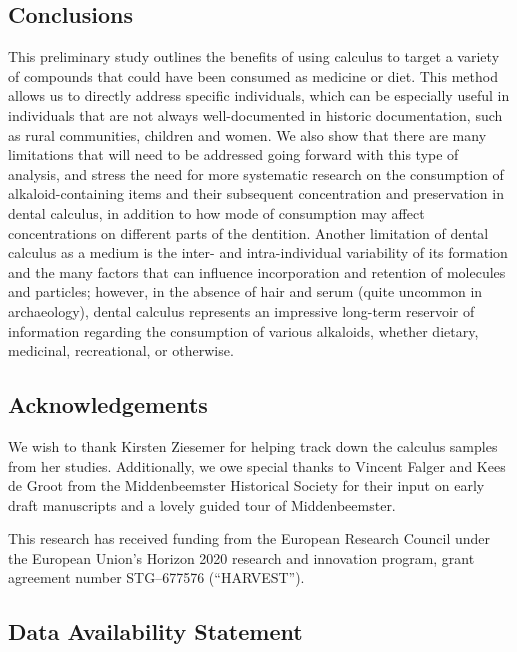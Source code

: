 \documentclass[
]{article}
\begin{document}
\hypertarget{conclusions}{%
\subsection{Conclusions}\label{conclusions}}

This preliminary study outlines the benefits of using calculus to target
a variety of compounds that could have been consumed as medicine or
diet. This method allows us to directly address specific individuals,
which can be especially useful in individuals that are not always
well-documented in historic documentation, such as rural communities,
children and women. We also show that there are many limitations that
will need to be addressed going forward with this type of analysis, and
stress the need for more systematic research on the consumption of
alkaloid-containing items and their subsequent concentration and
preservation in dental calculus, in addition to how mode of consumption
may affect concentrations on different parts of the dentition. Another
limitation of dental calculus as a medium is the inter- and
intra-individual variability of its formation and the many factors that
can influence incorporation and retention of molecules and particles;
however, in the absence of hair and serum (quite uncommon in
archaeology), dental calculus represents an impressive long-term
reservoir of information regarding the consumption of various alkaloids,
whether dietary, medicinal, recreational, or otherwise.

\hypertarget{acknowledgements}{%
\subsection*{Acknowledgements}\label{acknowledgements}}

We wish to thank Kirsten Ziesemer for helping track down the calculus
samples from her studies. Additionally, we owe special thanks to Vincent
Falger and Kees de Groot from the Middenbeemster Historical Society for
their input on early draft manuscripts and a lovely guided tour of
Middenbeemster.

This research has received funding from the European Research Council
under the European Union's Horizon 2020 research and innovation program,
grant agreement number STG--677576 (``HARVEST'').

\hypertarget{data-availability-statement}{%
\subsection*{Data Availability
Statement}\label{data-availability-statement}}
\end{document}
